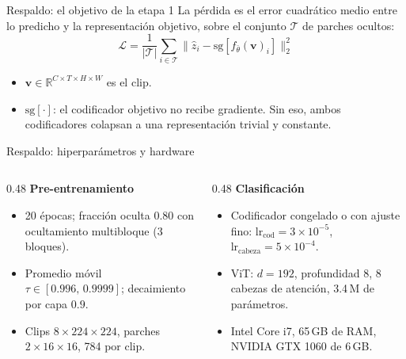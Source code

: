 \documentclass[aspectratio=169,10pt]{beamer}
\begin{document}
\begin{frame}{Respaldo: el objetivo de la etapa 1}
  La pérdida es el error cuadrático medio entre lo predicho y la
  representación objetivo, sobre el conjunto $\mathcal{T}$ de parches ocultos:
  \[
    \mathcal{L} = \frac{1}{|\mathcal{T}|}\sum_{i \in \mathcal{T}}
    \bigl\|\hat{z}_i - \mathrm{sg}\!\left[f_{\bar\theta}(\mathbf{v})_i\right]\bigr\|_2^2
  \]
  \small
  \begin{itemize}
    \item $\mathbf{v} \in \mathbb{R}^{C \times T \times H \times W}$ es el clip.
    \item $\mathrm{sg}[\cdot]$: el codificador objetivo no recibe gradiente.
          Sin eso, ambos codificadores colapsan a una representación trivial
          y constante.
  \end{itemize}
\end{frame}

\begin{frame}{Respaldo: hiperparámetros y hardware}
  \small
  \begin{columns}[T, onlytextwidth]
    \begin{column}{0.48\textwidth}
      \textbf{Pre-entrenamiento}
      \begin{itemize}
        \item 20 épocas; fracción oculta $0.80$ con ocultamiento multibloque
              (3 bloques).
        \item Promedio móvil $\tau \in [0.996,\, 0.9999]$; decaimiento por
              capa $0.9$.
        \item Clips $8{\times}224{\times}224$, parches
              $2{\times}16{\times}16$, 784 por clip.
      \end{itemize}
    \end{column}
    \begin{column}{0.48\textwidth}
      \textbf{Clasificación}
      \begin{itemize}
        \item Codificador congelado o con ajuste fino:
              $\text{lr}_{\text{cod}} = 3{\times}10^{-5}$,
              $\text{lr}_{\text{cabeza}} = 5{\times}10^{-4}$.
        \item ViT: $d{=}192$, profundidad 8, 8 cabezas de atención,
              3.4\,M de parámetros.
        \item Intel Core i7, 65\,GB de RAM, NVIDIA GTX 1060 de 6\,GB.
      \end{itemize}
    \end{column}
  \end{columns}
\end{frame}
\end{document}
